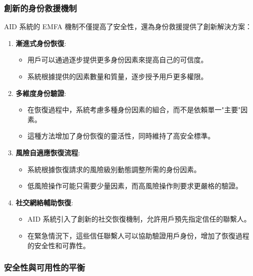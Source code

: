 \subsubsection{創新的身份救援機制}

AID 系統的 EMFA 機制不僅提高了安全性，還為身份救援提供了創新解決方案：

\begin{enumerate}
  \item \textbf{漸進式身份恢復}:
        \begin{itemize}
          \item 用戶可以通過逐步提供更多身份因素來提高自己的可信度。
          \item 系統根據提供的因素數量和質量，逐步授予用戶更多權限。
        \end{itemize}

  \item \textbf{多維度身份驗證}:
        \begin{itemize}
          \item 在恢復過程中，系統考慮多種身份因素的組合，而不是依賴單一"主要"因素。
          \item 這種方法增加了身份恢復的靈活性，同時維持了高安全標準。
        \end{itemize}

  \item \textbf{風險自適應恢復流程}:
        \begin{itemize}
          \item 系統根據恢復請求的風險級別動態調整所需的身份因素。
          \item 低風險操作可能只需要少量因素，而高風險操作則要求更嚴格的驗證。
        \end{itemize}

  \item \textbf{社交網絡輔助恢復}:
        \begin{itemize}
          \item AID 系統引入了創新的社交恢復機制，允許用戶預先指定信任的聯繫人。
          \item 在緊急情況下，這些信任聯繫人可以協助驗證用戶身份，增加了恢復過程的安全性和可靠性。
        \end{itemize}
\end{enumerate}

\subsubsection{安全性與可用性的平衡}

